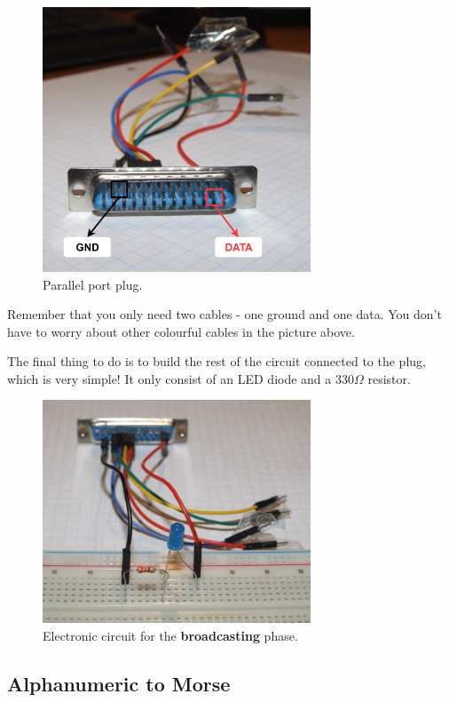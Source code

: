 \documentclass[10pt]{report}
\begin{document}
\begin{figure}[H]
\centering\includegraphics[width=8cm]{parport_plug}
\caption{Parallel port plug.}				
\label{fig:parport_plug}
\end{figure}

Remember that you only need two cables - one ground and one data. You don't have to worry about other colourful cables in the picture above.

The final thing to do is to build the rest of the circuit connected to the plug, which is very simple! It only consist of an LED diode and a 330$\Omega$ resistor.

\begin{figure}[H]
\centering\includegraphics[width=8cm]{broadcast_circuit}
\caption{Electronic circuit for the \textbf{broadcasting} phase.}				
\label{fig:broadcast_circuit}
\end{figure}

\subsection{Alphanumeric to Morse} \label{sec:asciitomorse}
\end{document}
